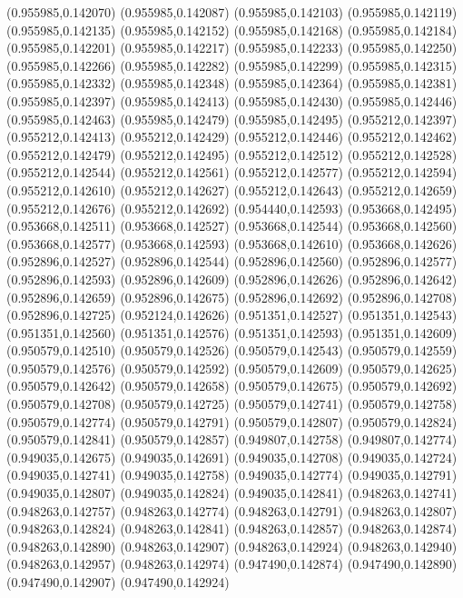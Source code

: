 (0.955985,0.142070)
(0.955985,0.142087)
(0.955985,0.142103)
(0.955985,0.142119)
(0.955985,0.142135)
(0.955985,0.142152)
(0.955985,0.142168)
(0.955985,0.142184)
(0.955985,0.142201)
(0.955985,0.142217)
(0.955985,0.142233)
(0.955985,0.142250)
(0.955985,0.142266)
(0.955985,0.142282)
(0.955985,0.142299)
(0.955985,0.142315)
(0.955985,0.142332)
(0.955985,0.142348)
(0.955985,0.142364)
(0.955985,0.142381)
(0.955985,0.142397)
(0.955985,0.142413)
(0.955985,0.142430)
(0.955985,0.142446)
(0.955985,0.142463)
(0.955985,0.142479)
(0.955985,0.142495)
(0.955212,0.142397)
(0.955212,0.142413)
(0.955212,0.142429)
(0.955212,0.142446)
(0.955212,0.142462)
(0.955212,0.142479)
(0.955212,0.142495)
(0.955212,0.142512)
(0.955212,0.142528)
(0.955212,0.142544)
(0.955212,0.142561)
(0.955212,0.142577)
(0.955212,0.142594)
(0.955212,0.142610)
(0.955212,0.142627)
(0.955212,0.142643)
(0.955212,0.142659)
(0.955212,0.142676)
(0.955212,0.142692)
(0.954440,0.142593)
(0.953668,0.142495)
(0.953668,0.142511)
(0.953668,0.142527)
(0.953668,0.142544)
(0.953668,0.142560)
(0.953668,0.142577)
(0.953668,0.142593)
(0.953668,0.142610)
(0.953668,0.142626)
(0.952896,0.142527)
(0.952896,0.142544)
(0.952896,0.142560)
(0.952896,0.142577)
(0.952896,0.142593)
(0.952896,0.142609)
(0.952896,0.142626)
(0.952896,0.142642)
(0.952896,0.142659)
(0.952896,0.142675)
(0.952896,0.142692)
(0.952896,0.142708)
(0.952896,0.142725)
(0.952124,0.142626)
(0.951351,0.142527)
(0.951351,0.142543)
(0.951351,0.142560)
(0.951351,0.142576)
(0.951351,0.142593)
(0.951351,0.142609)
(0.950579,0.142510)
(0.950579,0.142526)
(0.950579,0.142543)
(0.950579,0.142559)
(0.950579,0.142576)
(0.950579,0.142592)
(0.950579,0.142609)
(0.950579,0.142625)
(0.950579,0.142642)
(0.950579,0.142658)
(0.950579,0.142675)
(0.950579,0.142692)
(0.950579,0.142708)
(0.950579,0.142725)
(0.950579,0.142741)
(0.950579,0.142758)
(0.950579,0.142774)
(0.950579,0.142791)
(0.950579,0.142807)
(0.950579,0.142824)
(0.950579,0.142841)
(0.950579,0.142857)
(0.949807,0.142758)
(0.949807,0.142774)
(0.949035,0.142675)
(0.949035,0.142691)
(0.949035,0.142708)
(0.949035,0.142724)
(0.949035,0.142741)
(0.949035,0.142758)
(0.949035,0.142774)
(0.949035,0.142791)
(0.949035,0.142807)
(0.949035,0.142824)
(0.949035,0.142841)
(0.948263,0.142741)
(0.948263,0.142757)
(0.948263,0.142774)
(0.948263,0.142791)
(0.948263,0.142807)
(0.948263,0.142824)
(0.948263,0.142841)
(0.948263,0.142857)
(0.948263,0.142874)
(0.948263,0.142890)
(0.948263,0.142907)
(0.948263,0.142924)
(0.948263,0.142940)
(0.948263,0.142957)
(0.948263,0.142974)
(0.947490,0.142874)
(0.947490,0.142890)
(0.947490,0.142907)
(0.947490,0.142924)
